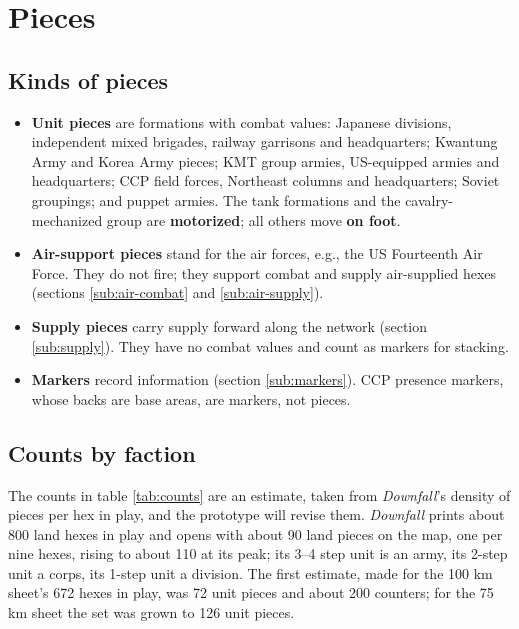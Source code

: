 \documentclass[11pt]{article}
\begin{document}
\section{Pieces}\label{sec:pieces}
\subsection{Kinds of pieces}
\begin{itemize}
\item \textbf{Unit pieces} are formations with combat values: Japanese divisions, independent mixed brigades, railway garrisons and headquarters; Kwantung Army and Korea Army pieces; KMT group armies, US-equipped armies and headquarters; CCP field forces, Northeast columns and headquarters; Soviet groupings; and puppet armies. The tank formations and the cavalry-mechanized group are \textbf{motorized}; all others move \textbf{on foot}.
\item \textbf{Air-support pieces} stand for the air forces, e.g., the US Fourteenth Air Force. They do not fire; they support combat and supply air-supplied hexes (sections \ref{sub:air-combat} and \ref{sub:air-supply}).
\item \textbf{Supply pieces} carry supply forward along the network (section \ref{sub:supply}). They have no combat values and count as markers for stacking.
\item \textbf{Markers} record information (section \ref{sub:markers}). CCP presence markers, whose backs are base areas, are markers, not pieces.
\end{itemize}

\subsection{Counts by faction}\label{sub:counts}
The counts in table \ref{tab:counts} are an estimate, taken from \emph{Downfall}'s density of pieces per hex in play, and the prototype will revise them. \emph{Downfall} prints about 800 land hexes in play and opens with about 90 land pieces on the map, one per nine hexes, rising to about 110 at its peak; its 3--4 step unit is an army, its 2-step unit a corps, its 1-step unit a division. The first estimate, made for the 100 km sheet's 672 hexes in play, was 72 unit pieces and about 200 counters; for the 75 km sheet the set was grown to 126 unit pieces.
\end{document}

